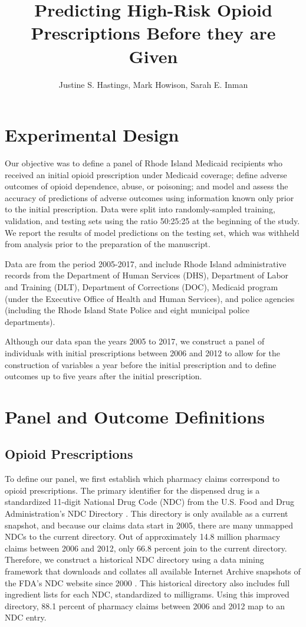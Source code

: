 \documentclass[9pt,twoside,lineno]{pnas-new}
\title{Predicting High-Risk Opioid Prescriptions Before they are Given}
\author{Justine S. Hastings, Mark Howison, Sarah E. Inman}
\begin{document}
\maketitle

\SItext

\section{Experimental Design}

Our objective was to define a panel of Rhode Island Medicaid recipients who received an initial opioid prescription under Medicaid coverage; define adverse outcomes of opioid dependence, abuse, or poisoning; and model and assess the accuracy of predictions of adverse outcomes using information known only prior to the initial prescription. Data were split into randomly-sampled training, validation, and testing sets using the ratio 50:25:25 at the beginning of the study. We report the results of model predictions on the testing set, which was withheld from analysis prior to the preparation of the manuscript.

Data are from the period 2005-2017, and include Rhode Island administrative records from the Department of Human Services (DHS), Department of Labor and Training (DLT), Department of Corrections (DOC), Medicaid program (under the Executive Office of Health and Human Services), and police agencies (including the Rhode Island State Police and eight municipal police departments).

Although our data span the years 2005 to 2017, we construct a panel of individuals with initial prescriptions between 2006 and 2012 to allow for the construction of variables a year before the initial prescription and to define outcomes up to five years after the initial prescription.

\section{Panel and Outcome Definitions}

\subsection{Opioid Prescriptions}

To define our panel, we first establish which pharmacy claims correspond to opioid prescriptions. The primary identifier for the dispensed drug is a standardized 11-digit National Drug Code (NDC) from the U.S. Food and Drug Administration's NDC Directory \cite{ndc}. This directory is only available as a current snapshot, and because our claims data start in 2005, there are many unmapped NDCs to the current directory. Out of approximately 14.8 million pharmacy claims between 2006 and 2012, only 66.8 percent join to the current directory. Therefore, we construct a historical NDC directory using a data mining framework that downloads and collates all available Internet Archive snapshots of the FDA's NDC website since 2000 \cite{historicalndc}. This historical directory also includes full ingredient lists for each NDC, standardized to milligrams. Using this improved directory, 88.1 percent of pharmacy claims between 2006 and 2012 map to an NDC entry. 
\end{document}
